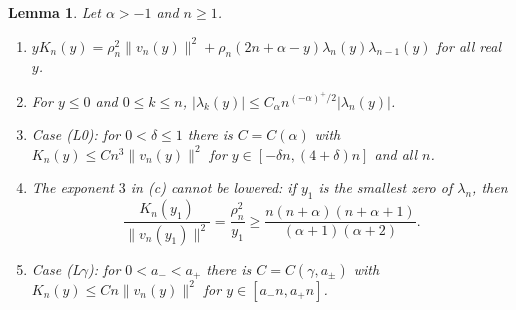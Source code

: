 \documentclass[11pt]{amsart}
\newtheorem{lemma}[theorem]{Lemma}
\theoremstyle{definition}
\theoremstyle{remark}
\numberwithin{equation}{section}
\begin{document}
\begin{lemma}\label{lem:lag-cd}
Let $\alpha>-1$ and $n\ge1$.
\begin{enumerate}
\item[(a)] $yK_n(y)=\rho_n^2\|v_n(y)\|^2+\rho_n(2n+\alpha-y)\lambda_n(y)\lambda_{n-1}(y)$ for all real $y$.
\item[(b)] For $y\le0$ and $0\le k\le n$, $|\lambda_k(y)|\le C_\alpha n^{(-\alpha)^+/2}|\lambda_n(y)|$.
\item[(c)] Case (L0): for $0<\delta\le1$ there is $C=C(\alpha)$ with $K_n(y)\le Cn^3\|v_n(y)\|^2$ for $y\in[-\delta n,(4+\delta)n]$ and all $n$.
\item[(d)] The exponent $3$ in (c) cannot be lowered: if $y_1$ is the smallest zero of $\lambda_n$, then
\[
\frac{K_n(y_1)}{\|v_n(y_1)\|^2}=\frac{\rho_n^2}{y_1}\ge\frac{n(n+\alpha)(n+\alpha+1)}{(\alpha+1)(\alpha+2)} .
\]
\item[(e)] Case (L$\gamma$): for $0<a_-<a_+$ there is $C=C(\gamma,a_\pm)$ with $K_n(y)\le Cn\|v_n(y)\|^2$ for $y\in[a_-n,a_+n]$.
\end{enumerate}
\end{lemma}
\end{document}
